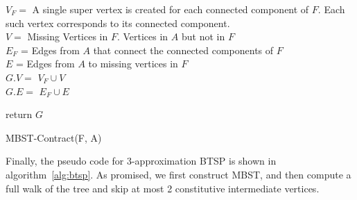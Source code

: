 \documentclass[runningheads, a4paper]{llncs}
\begin{document}
\begin{algorithm}[H]
    
    $V_{F} = $ A single super vertex is created for each connected component of $F$. Each such vertex corresponds to its connected component. \\
    $V = $ Missing Vertices in $F$. Vertices in $A$ but not in $F$ \\
    
    $E_{F}$ = Edges from $A$ that connect the connected components of $F$\\
    $E$ = Edges from $A$ to missing vertices in $F$ \\
    
    $G.V = $ $V_{F} \cup V $ \\
    $G.E = $ $E_{F} \cup E $
    
    return $G$
    
    \caption{MBST-Contract(F, A)}
    \label{alg:mbst_contract}
\end{algorithm}

Finally, the pseudo code for 3-approximation BTSP is shown in algorithm~\ref{alg:btsp}. As promised, we first construct MBST, and then compute a full walk of the tree and skip at most 2 constitutive intermediate vertices.
\end{document}
